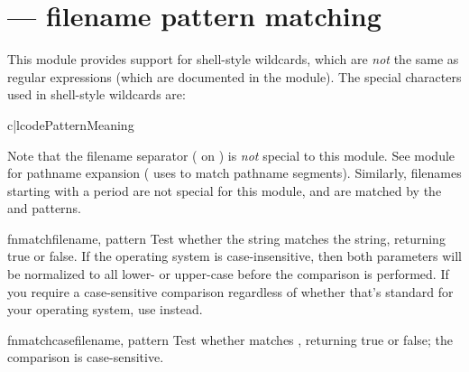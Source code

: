 \section{ ---
         \UNIX{} filename pattern matching}




This module provides support for \UNIX{} shell-style wildcards, which
are \emph{not} the same as regular expressions (which are documented
in the  module).  The special
characters used in shell-style wildcards are:

\begin{tableii}{c|l}{code}{Pattern}{Meaning}
\end{tableii}

Note that the filename separator ( on \UNIX{}) is \emph{not}
special to this module.  See module
 for pathname expansion
( uses  to match pathname
segments).  Similarly, filenames starting with a period are
not special for this module, and are matched by the \code{*} and
 patterns.


\begin{funcdesc}{fnmatch}{filename, pattern}
Test whether the  string matches the 
string, returning true or false.  If the operating system is
case-insensitive, then both parameters will be normalized to all
lower- or upper-case before the comparison is performed.  If you
require a case-sensitive comparison regardless of whether that's
standard for your operating system, use 
instead.
\end{funcdesc}

\begin{funcdesc}{fnmatchcase}{filename, pattern}
Test whether  matches , returning true or
false; the comparison is case-sensitive.
\end{funcdesc}


\begin{seealso}
\end{seealso}
